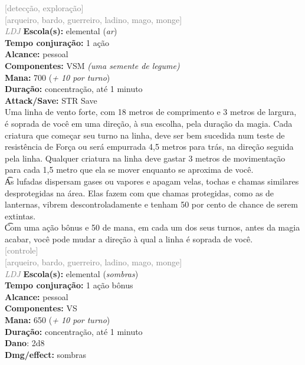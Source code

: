 \documentclass{RPG_Adventure}[2021/10/20]
\begin{document}
{\scriptsize \textcolor{gray}{[detecção, exploração]\\}}
{\scriptsize \textcolor{gray}{[arqueiro, bardo, guerreiro, ladino, mago, monge]\\}}
{\tiny \textcolor{gray}{\textit{LDJ}}}
{\small \t \textbf{Escola(s):} elemental (\textit{ar})\\\t \textbf{Tempo conjuração:} 1 ação\\\t \textbf{Alcance:} pessoal\\\t \textbf{Componentes:} VSM \textit{(uma semente de legume)}\\\t \textbf{Mana:} 700 (\textit{+ 10 por turno})\\\t \textbf{Duração:} concentração, até 1 minuto\\\t \textbf{Attack/Save:} STR Save\\}
{\normalsize Uma linha de vento forte, com 18 metros de comprimento e 3 metros de largura, é soprada de você em uma direção, à sua escolha, pela duração da magia. Cada criatura que começar seu turno na linha, deve ser bem sucedida num teste de resistência de Força ou será empurrada 4,5 metros para trás, na direção seguida pela linha. Qualquer criatura na linha deve gastar 3 metros de movimentação para cada 1,5 metro que ela se mover enquanto se aproxima de você.\\\t As lufadas dispersam gases ou vapores e apagam velas, tochas e chamas similares desprotegidas na área. Elas fazem com que chamas protegidas, como as de lanternas, vibrem descontroladamente e tenham 50 por cento de chance de serem extintas.\\\t Com uma ação bônus e 50 de mana, em cada um dos seus turnos, antes da magia acabar, você pode mudar a direção à qual a linha é soprada de você.\\}
{\scriptsize \textcolor{gray}{[controle]\\}}
{\scriptsize \textcolor{gray}{[arqueiro, bardo, guerreiro, ladino, mago, monge]\\}}
{\tiny \textcolor{gray}{\textit{LDJ}}}
{\small \t \textbf{Escola(s):} elemental (\textit{sombras})\\\t \textbf{Tempo conjuração:} 1 ação bônus\\\t \textbf{Alcance:} pessoal\\\t \textbf{Componentes:} VS\\\t \textbf{Mana:} 650 (\textit{+ 10 por turno})\\\t \textbf{Duração:} concentração, até 1 minuto\\\t \textbf{Dano}: 2d8\\\t \textbf{Dmg/effect:} sombras\\}
\end{document}
